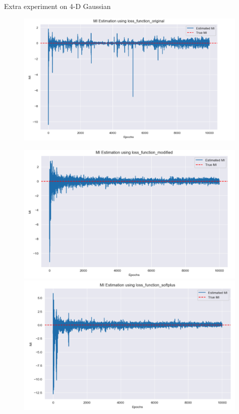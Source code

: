 \documentclass[final]{beamer}
\newlength{\colwidth}
\begin{document}
\begin{frame}[t]
\begin{columns}[t]
\begin{column}{\colwidth}
\begin{block}{Extra experiment on 4-D Gaussian}
    \begin{figure}
      \centering
      \includegraphics[width=0.52\linewidth]{截屏2024-12-31 13.55.00.png}
    \end{figure}

    \begin{figure}
    \centering
    \begin{minipage}{0.49\textwidth}
    \centering
    \includegraphics[width=1\linewidth]{4d/截屏2024-12-31 13.58.09.png}
    \end{minipage}
    \begin{minipage}{0.49\textwidth}
    \centering
    \centering
    \includegraphics[width=1\linewidth]{4d/截屏2024-12-31 13.58.36.png}
    \end{minipage}
    \end{figure}


\end{block}
\end{column}
\end{columns}
\end{frame}
\end{document}

